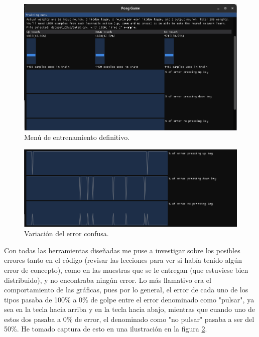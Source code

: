 \begin{figure}[H]
	\centering
	\includegraphics[width=15cm]{archivos/imagenes/menu-de-entrenamiento-definitivo.png}
	\caption{Menú de entrenamiento definitivo.}
	\label{ultimo menu de entrenamiento}
\end{figure}

\begin{figure}[H]
	\centering
	\includegraphics[width=15cm]{archivos/imagenes/error-erratico.png}
	\caption{Variación del error confusa.}
	\label{error erratico}
\end{figure}

Con todas las herramientas diseñadas me puse a investigar sobre los posibles errores tanto en el código (revisar las lecciones para ver si había tenido algún error de concepto), como en las muestras que se le entregan (que estuviese bien distribuido), y no encontraba ningún error. Lo más llamativo era el comportamiento de las gráficas, pues por lo general, el error de cada uno de los tipos pasaba de 100\% a 0\% de golpe entre el error denominado como "pulsar", ya sea en la tecla hacia arriba y en la tecla hacia abajo, mientras que cuando uno de estos dos pasaba a 0\% de error, el denominado como "no pulsar" pasaba a ser del 50\%. He tomado captura de esto en una ilustración en la figura \ref{error erratico}.

